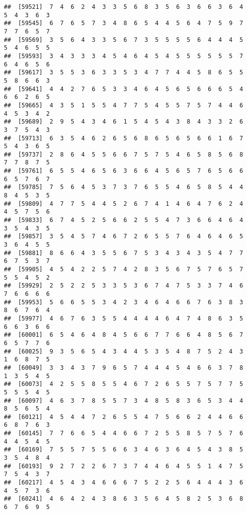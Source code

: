 \documentclass[
]{book}
\begin{document}
\begin{verbatim}
##  [59521]  7  4  6  2  4  3  3  5  6  8  3  5  6  3  6  6  3  6  4  5  4  3  6  3
##  [59545]  6  7  6  5  7  3  4  8  6  5  4  4  5  6  4  7  5  9  7  7  7  6  5  7
##  [59569]  3  5  6  4  3  3  5  6  7  3  5  5  5  5  6  4  4  4  5  5  4  6  5  5
##  [59593]  3  4  3  3  3  4  5  4  6  4  5  4  5  5  5  5  5  5  7  6  4  6  5  6
##  [59617]  3  5  5  3  6  3  3  5  3  4  7  7  4  4  5  8  6  5  5  5  8  6  6  3
##  [59641]  4  4  2  7  6  5  3  3  4  6  4  5  6  5  6  6  6  5  4  6  6  2  6  5
##  [59665]  4  3  5  1  5  5  4  7  7  5  4  5  5  7  5  7  4  4  6  4  5  3  4  2
##  [59689]  2  9  5  4  3  4  6  1  5  4  5  4  3  8  4  3  3  2  6  3  7  5  4  3
##  [59713]  6  3  5  4  6  2  6  5  6  8  6  5  6  5  6  6  1  6  7  5  4  3  6  5
##  [59737]  2  8  6  4  5  5  6  6  7  5  7  5  4  6  5  8  5  6  8  7  7  8  7  5
##  [59761]  6  5  5  4  6  5  6  3  6  6  4  5  6  5  7  6  5  6  6  6  5  7  6  7
##  [59785]  7  5  6  4  5  3  7  3  7  6  5  5  4  6  5  8  5  4  4  8  4  5  3  5
##  [59809]  4  7  7  5  4  4  5  2  6  7  4  1  4  6  4  7  6  2  4  4  5  7  5  6
##  [59833]  6  7  4  5  2  5  6  6  2  5  5  4  7  3  6  6  4  6  4  3  5  4  3  5
##  [59857]  3  5  4  5  7  4  6  7  2  6  5  5  7  6  4  6  4  6  5  3  6  4  5  5
##  [59881]  8  6  6  4  3  5  5  6  7  5  3  4  3  4  3  5  4  7  7  6  7  5  3  7
##  [59905]  4  5  4  2  2  5  7  4  2  8  3  5  6  7  5  7  6  5  7  5  5  4  5  2
##  [59929]  2  5  2  2  5  3  3  5  3  6  7  4  7  5  3  3  7  4  6  7  6  6  6  6
##  [59953]  5  6  6  5  5  3  4  2  3  4  6  4  6  6  7  6  3  8  3  8  6  7  6  4
##  [59977]  4  6  7  6  3  5  5  4  4  4  4  6  4  7  4  8  6  3  5  6  6  3  6  6
##  [60001]  6  5  4  6  4  8  4  5  6  6  7  7  6  6  4  8  5  6  7  6  5  7  7  6
##  [60025]  9  3  5  6  5  4  3  4  4  5  3  5  4  8  7  5  2  4  3  1  6  8  7  5
##  [60049]  3  3  4  3  7  9  6  5  7  4  4  4  5  4  6  6  3  7  8  1  3  5  4  5
##  [60073]  4  2  5  5  8  5  5  4  6  7  2  6  5  5  7  5  7  7  5  5  5  5  4  5
##  [60097]  4  6  3  7  8  5  5  7  3  4  8  5  8  3  6  5  3  4  4  8  5  6  5  4
##  [60121]  4  5  4  4  7  2  6  5  5  4  7  5  6  6  2  4  4  6  6  6  8  7  6  3
##  [60145]  7  7  6  6  5  4  4  6  6  7  2  5  5  8  5  7  5  7  6  4  4  5  4  5
##  [60169]  7  5  5  7  5  5  6  6  3  4  6  3  6  4  5  4  3  8  5  3  5  4  8  4
##  [60193]  9  2  7  2  2  6  7  3  7  4  4  6  4  5  5  1  4  7  5  7  5  4  3  7
##  [60217]  4  5  4  3  4  6  6  6  7  5  2  2  5  6  4  4  4  3  6  4  5  7  3  6
##  [60241]  4  6  4  2  4  3  8  6  3  5  6  4  5  8  2  5  3  6  8  6  7  6  9  5

\end{verbatim}
\end{document}
